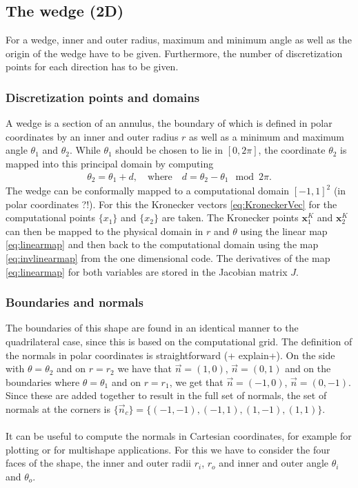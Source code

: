\documentclass[11pt, a4paper]{article}
\theoremstyle{definition}
\begin{document}
\subsection{The wedge (2D)}
For a wedge, inner and outer radius, maximum and minimum angle as well as the origin of the wedge have to be given. Furthermore, the number of discretization points for each direction has to be given.
\subsubsection{Discretization points and domains}\label{sec:2DWedgePts}
A wedge is a section of an annulus, the boundary of which is defined in polar coordinates by an inner and outer radius $r$ as well as a minimum and maximum angle $\theta_1$ and $\theta_2$. While $\theta_1$ should be chosen to lie in $[0, 2 \pi]$, the coordinate $\theta_2$ is mapped into this principal domain by computing 
\begin{align*}
	\theta_2 = \theta_1 +  d, \quad \text{where} \quad d = \theta_2 - \theta_1\mod 2 \pi.
\end{align*}
The wedge can be conformally mapped to a computational domain $[-1,1]^2$ (in polar coordinates ?!). For this the Kronecker vectors \eqref{eq:KroneckerVec} for the computational points $\{x_1\}$ and $\{x_2\}$ are taken. 
The Kronecker points $\mathbf{x}_1^{K}$ and $\mathbf{x}_2^{K}$ can then be mapped to the physical domain in $r$ and $\theta$ using the linear map \eqref{eq:linearmap} and then back to the computational domain using the map \eqref{eq:invlinearmap} from the one dimensional code. The derivatives of the map \eqref{eq:linearmap} for both variables are stored in the Jacobian matrix $J$.


\subsubsection{Boundaries and normals}
The boundaries of this shape are found in an identical manner to the quadrilateral case, since this is based on the computational grid. The definition of the normals in polar coordinates is straightforward (+ explain+). On the side with $\theta = \theta_2$ and on $r = r_2$ we have that $\vec n = (1,0)$, $\vec n = (0,1)$ and on the boundaries where $\theta = \theta_1$ and on $r = r_1$, we get that $\vec n = (-1,0)$, $\vec n = (0,-1)$. Since these are added together to result in the full set of normals, the set of normals at the corners is $\{\vec n_c\} = \{(-1,-1), (-1,1), (1,-1), (1,1)\}$. 
\\
\\
It can be useful to compute the normals in Cartesian coordinates, for example for plotting or for multishape applications. For this we have to consider the four faces of the shape, the inner and outer radii $r_i$, $r_o$ and inner and outer angle $\theta_i$ and $\theta_o$.
\end{document}
